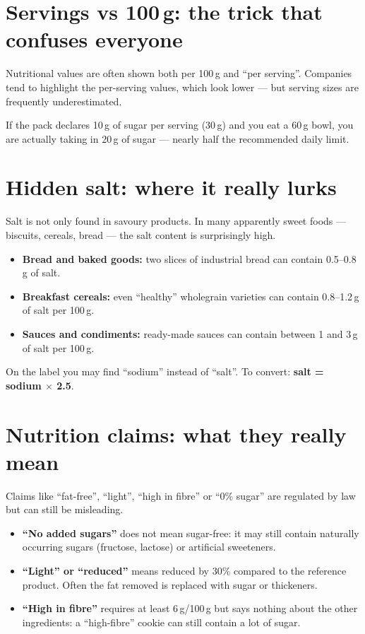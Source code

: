 \documentclass[a5paper,12pt,oneside,openany]{book}
\newcommand{\boxyellow}[2]{%
  \begin{tcolorbox}[boxbase,
    colback=warnyellow!12!white, colframe=warnyellow!80!black, title={#1}]
  #2\end{tcolorbox}}
\newcommand{\boxinfo}[2]{%
  \begin{tcolorbox}[boxbase,
    colback=infoBlue!8!white, colframe=infoBlue, title={#1}]
  #2\end{tcolorbox}}
\begin{document}
\section{Servings vs 100\,g: the trick that confuses everyone}

Nutritional values are often shown both per 100\,g and ``per serving''.
Companies tend to highlight the per-serving values, which look lower ---
but serving sizes are frequently underestimated.

\boxyellow{Example}{If the pack declares 10\,g of sugar per serving (30\,g)
and you eat a 60\,g bowl, you are actually taking in 20\,g of sugar ---
nearly half the recommended daily limit.}

\section{Hidden salt: where it really lurks}

Salt is not only found in savoury products. In many apparently sweet foods
--- biscuits, cereals, bread --- the salt content is surprisingly high.

\begin{itemize}
  \item \textbf{Bread and baked goods:} two slices of industrial bread can
    contain 0.5--0.8\,g of salt.
  \item \textbf{Breakfast cereals:} even ``healthy'' wholegrain varieties
    can contain 0.8--1.2\,g of salt per 100\,g.
  \item \textbf{Sauces and condiments:} ready-made sauces can contain
    between 1 and 3\,g of salt per 100\,g.
\end{itemize}

\boxinfo{Important note}{On the label you may find ``sodium'' instead of
``salt''. To convert: \textbf{salt = sodium $\times$ 2.5}.}

\section{Nutrition claims: what they really mean}

Claims like ``fat-free'', ``light'', ``high in fibre'' or ``0\% sugar'' are
regulated by law but can still be misleading.

\begin{itemize}
  \item \textbf{``No added sugars''} does not mean sugar-free: it may
    still contain naturally occurring sugars (fructose, lactose) or
    artificial sweeteners.
  \item \textbf{``Light'' or ``reduced''} means reduced by 30\% compared
    to the reference product. Often the fat removed is replaced with sugar
    or thickeners.
  \item \textbf{``High in fibre''} requires at least 6\,g/100\,g but says
    nothing about the other ingredients: a ``high-fibre'' cookie can still
    contain a lot of sugar.
\end{itemize}
\end{document}
